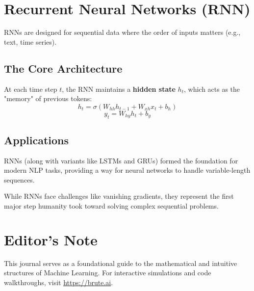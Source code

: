 \documentclass[11pt,fleqn]{book}
\begin{document}
\chapter{Recurrent Neural Networks (RNN)}

RNNs are designed for sequential data where the order of inputs matters (e.g., text, time series).

\section{The Core Architecture}
At each time step $t$, the RNN maintains a \textbf{hidden state} $h_t$, which acts as the "memory" of previous tokens:
\[h_t = \sigma(W_{hh}h_{t-1} + W_{xh}x_t + b_h)\]
\[y_t = W_{hy}h_t + b_y\]

\section{Applications}
RNNs (along with variants like LSTMs and GRUs) formed the foundation for modern NLP tasks, providing a way for neural networks to handle variable-length sequences.

\begin{callout}
    While RNNs face challenges like vanishing gradients, they represent the first major step humanity took toward solving complex sequential problems.
\end{callout}

\chapter*{Editor's Note}
This journal serves as a foundational guide to the mathematical and intuitive structures of Machine Learning. For interactive simulations and code walkthroughs, visit \url{https://brute.ai}.
\end{document}
